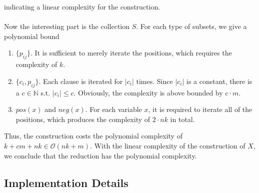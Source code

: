 indicating a linear complexity for the construction. \\\\
Now the interesting part is the collection $S$. For each type of subsets, we give a polynomial bound 
\begin{enumerate}
    \item $\{p_{ij}\}$. It is sufficient to merely iterate the positions, which requires the complexity of $k$.
    \item $\{c_i, p_{ij}\}$. Each clause is iterated for $|c_i|$ times. Since $|c_i|$ is a constant, there is a $c \in \mathbb{N}$ 
    s.t. $|c_i| \leq c$. Obviously, the complexity is above bounded by $c \cdot m$.
    \item $pos(x)$ and $neg(x)$. For each variable $x$, it is required to iterate all of the positions, which produces the complexity 
    of $2 \cdot nk$ in total.
\end{enumerate}
Thus, the construction costs the polynomial complexity of $k + cm + nk \in \mathcal{O}(nk + m)$. 
With the linear complexity of the construction of $X$, we conclude that the reduction has the polynomial complexity.

\subsection{Implementation Details}
\label{sec:sat-imp}
